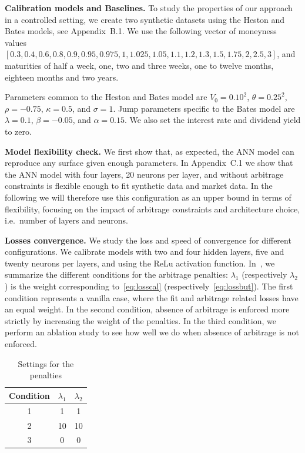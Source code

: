\textbf{Calibration models and Baselines.}
To study the properties of our approach in a controlled setting, we create two synthetic datasets using the Heston and Bates models, see Appendix~B.1.
We use the following vector of moneyness values $[0.3, 0.4, 0.6, 0.8, 0.9, 0.95, 0.975, 1, 1.025, 1.05, 1.1, 1.2, 1.3, 1.5, 1.75, 2, 2.5, 3]$, and maturities 
of half a week, one, two and three weeks, one to twelve months, eighteen months and two years.

Parameters common to the Heston and Bates model are 
$V_0 = 0.10^2$,
$\theta = 0.25^2$,
$\rho = -0.75$,
$\kappa =  0.5$, and
$\sigma = 1$.
Jump parameters specific to the Bates model are 
$\lambda = 0.1$,
$\beta = -0.05$, and
$\alpha = 0.15$.
We also set the interest rate and dividend yield to zero.

\textbf{Model flexibility check.}
We first show that, as expected, the ANN model can reproduce any surface given enough parameters.
In Appendix~C.1 we show that the ANN model with four layers, 20 neurons per layer, and without arbitrage constraints is flexible enough to fit synthetic data and market data.
In the following we will therefore use this configuration as an upper bound in terms of flexibility, focusing on the impact of arbitrage constraints and architecture choice, i.e.\ number of layers and neurons.


\textbf{Losses convergence.}
We study the loss and speed of convergence for different configurations.
We calibrate models with two and four hidden layers, five and twenty neurons per layers, and using the ReLu activation function.
In~, we summarize the different conditions for the arbitrage penalties: 
$\lambda_1$ (respectively $\lambda_2$) is the weight corresponding to~\eqref{eq:losscal} (respectively~\eqref{eq:lossbut}).
The first condition represents a vanilla case, where the fit and arbitrage related losses have an equal weight.
In the second condition, absence of arbitrage is enforced more strictly by increasing the weight of the penalties.
In the third condition, we perform an ablation study to see how well we do when absence of arbitrage is not enforced.

\begin{table}
\caption{Settings for the penalties\label{tab:conditions}}
\centering
  \begin{tabular}{ c  c c }
\toprule
  Condition & $\lambda_1$ & $\lambda_2$ \\
  \hline
  1 & 1 & 1 \\
  2 & 10 & 10 \\
  3 & 0 & 0 \\
\bottomrule
\end{tabular}
\end{table}

